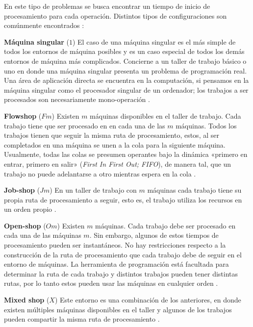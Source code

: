 \documentclass[spanish,draft,12pt,headsepline,footsepline,paper=letter]{scrreprt}
\begin{document}
En este tipo de problemas se busca encontrar un tiempo de inicio de procesamiento para cada operación. Distintos tipos de configuraciones son comúnmente encontrados \citep[p.~8]{TKindt2002}:

\textbf{Máquina singular} ($1$) El caso de una máquina singular es el más simple de todos los entornos de máquina posibles y es un caso especial de todos los demás entornos de máquina más complicados. Concierne a un taller de trabajo básico o uno en donde una máquina singular presenta un problema de programación real. Una área de aplicación directa se encuentra en la computación, si pensamos en la máquina singular como el procesador singular de un ordenador; los trabajos a ser procesados son necesariamente mono-operación \citep[p.~8, p.~14]{TKindt2002,Pinedo1995}.

\textbf{Flowshop} ($Fm$) Existen $m$ máquinas disponibles en el taller de trabajo. Cada trabajo tiene que ser procesado en en cada una de las $m$ máquinas. Todos los trabajos tienen que seguir la misma ruta de procesamiento, estos, al ser completados en una máquina se unen a la cola para la siguiente máquina. Usualmente, todas las colas se presumen operantes bajo la dinámica  «primero en entrar, primero en salir» (\textit{First In First Out; FIFO}), de manera tal, que un trabajo no puede adelantarse a otro mientras espera en la cola \citep[p.~8, p.~15]{TKindt2002,Pinedo1995}.

\textbf{Job-shop} ($Jm$) En un taller de trabajo con $m$ máquinas cada trabajo tiene su propia ruta de procesamiento a seguir, esto es, el trabajo utiliza los recursos en un orden propio \citep[p.~8, p.~15]{TKindt2002,Pinedo1995}.

\textbf{Open-shop} ($Om$) Existen $m$ máquinas. Cada trabajo debe ser procesado en cada una de las máquinas $m$. Sin embargo, algunos de estos tiempos de procesamiento pueden ser instantáneos. No hay restricciones respecto a la construcción de la ruta de procesamiento que cada trabajo debe de seguir en el entorno de máquinas. La herramienta de programación está facultada para determinar la ruta de cada trabajo y distintos trabajos pueden tener distintas rutas, por lo tanto estos pueden usar las máquinas en cualquier orden \citep[p.~8, p.~15]{TKindt2002,Pinedo1995}.

\textbf{Mixed shop} ($X$) Este entorno es una combinación de los anteriores, en donde existen múltiples máquinas disponibles en el taller y algunos de los trabajos pueden compartir la misma ruta de procesamiento \citep[p.~8]{TKindt2002}.
\end{document}
